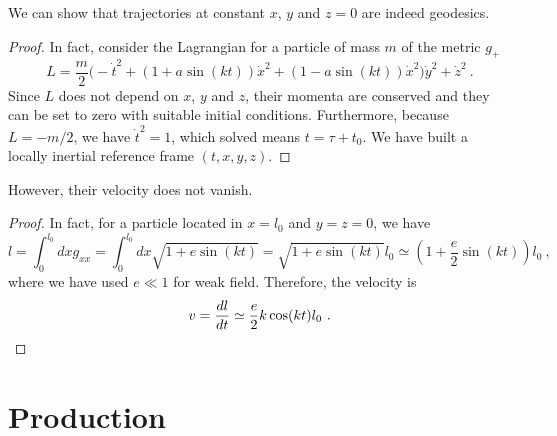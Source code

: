     We can show that trajectories at constant $x$, $y$ and $z=0$ are indeed geodesics.
    \begin{proof}
        In fact, consider the Lagrangian for a particle of mass $m$ of the metric $g_+$
        \begin{equation*}
            L = \frac{m}{2} \Big ( - \dot t^2 + (1 + a \sin(kt)) \dot x^2 + (1 - a \sin(kt)) \dot x^2 \Big) \dot y^2 + \dot z^2 ~.
        \end{equation*}
        Since $L$ does not depend on $x$, $y$ and $z$, their momenta are conserved and they can be set to zero with suitable initial conditions. Furthermore, because $L = - m/2$, we have $\dot t^2 = 1$, which solved means $t = \tau + t_0$. We have built a locally inertial reference frame $(t, x, y, z)$.
    \end{proof}

    However, their velocity does not vanish. 
    \begin{proof}
        In fact, for a particle located in $x=l_0$ and $y = z = 0$, we have 
        \begin{equation*}
            l = \int_0^{l_0} dx g_{xx} = \int_0^{l_0} dx \sqrt{1 + e \sin(kt)} =\sqrt{1 + e \sin(kt)} l_0 \simeq (1 + \frac{e}{2} \sin(kt) ) l_0 ~,
        \end{equation*}
        where we have used $e \ll 1$ for weak field. Therefore, the velocity is 
        \begin{equation*}
            v = \frac{dl}{dt} \simeq \frac{e}{2} k \cos(kt) l_0 ~.
        \end{equation*}
    \end{proof}

\section{Production}

